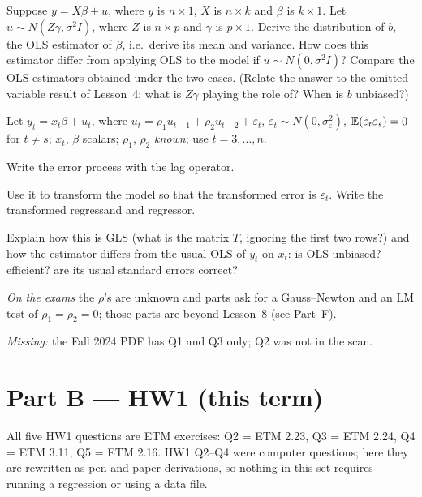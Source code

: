 \documentclass[11pt]{article}
\begin{document}
Suppose $y = X\beta + u$, where $y$ is $n \times 1$, $X$ is $n \times k$ and
$\beta$ is $k \times 1$. Let $u \sim N(Z\gamma, \sigma^{2}I)$, where $Z$ is
$n \times p$ and $\gamma$ is $p \times 1$. Derive the distribution of $b$, the
OLS estimator of $\beta$, i.e.\ derive its mean and variance. How does this
estimator differ from applying OLS to the model if $u \sim N(0,\sigma^{2}I)$?
Compare the OLS estimators obtained under the two cases. (Relate the answer to
the omitted-variable result of Lesson~4: what is $Z\gamma$ playing the role of?
When is $b$ unbiased?)

Let $y_{t} = x_{t}\beta + u_{t}$, where
$u_{t} = \rho_{1}u_{t-1} + \rho_{2}u_{t-2} + \varepsilon_{t}$,
$\varepsilon_{t} \sim N(0,\sigma_{\varepsilon}^{2})$, $\mathbb{E}(\varepsilon_{t}\varepsilon_{s}) = 0$
for $t \neq s$; $x_{t}$, $\beta$ scalars; $\rho_{1}$, $\rho_{2}$ \emph{known}; use $t = 3,\dots,n$.
\begin{flatlist}
  \item[(i)] Write the error process with the lag operator.
  \item[(ii)] Use it to transform the model so that the transformed error is
        $\varepsilon_{t}$. Write the transformed regressand and regressor.
  \item[(iii)] Explain how this is GLS (what is the matrix $T$, ignoring the first two rows?)
        and how the estimator differs from the usual OLS of $y_{t}$ on $x_{t}$: is OLS
        unbiased? efficient? are its usual standard errors correct?
\end{flatlist}
\emph{On the exams} the $\rho$'s are unknown and parts ask for a Gauss--Newton and an LM
test of $\rho_{1} = \rho_{2} = 0$; those parts are beyond Lesson~8 (see Part~F).

\par\smallskip
\emph{Missing:} the Fall 2024 PDF has Q1 and Q3 only; Q2 was not in the scan.

\section{Part B --- HW1 (this term)}

All five HW1 questions are ETM exercises: Q2 = ETM 2.23, Q3 = ETM 2.24,
Q4 = ETM 3.11, Q5 = ETM 2.16. HW1 Q2--Q4 were computer questions; here they are
rewritten as pen-and-paper derivations, so nothing in this set requires running a
regression or using a data file.
\end{document}
